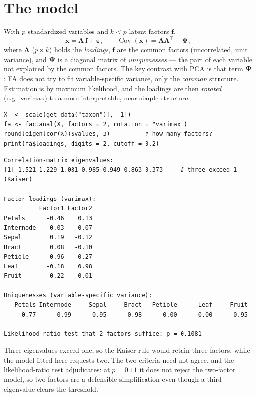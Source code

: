 \documentclass[11pt,oneside]{book}
\begin{document}
\section{The model}
With $p$ standardized variables and $k<p$ latent factors $\mathbf f$,
\[
  \mathbf x=\mathbf\Lambda\,\mathbf f+\boldsymbol\varepsilon,\qquad
  \operatorname{Cov}(\mathbf x)=\mathbf\Lambda\mathbf\Lambda^{\!\top}+\mathbf\Psi,
\]
where $\mathbf\Lambda$ ($p\times k$) holds the \emph{loadings}, $\mathbf f$ are the
common factors (uncorrelated, unit variance), and $\mathbf\Psi$ is a diagonal matrix of
\emph{uniquenesses} — the part of each variable not explained by the common factors. The
key contrast with PCA is that term $\mathbf\Psi$: FA does not try to fit variable-specific
variance, only the \emph{common} structure. Estimation is by maximum likelihood, and the
loadings are then \emph{rotated} (e.g.\ varimax) to a more interpretable, near-simple
structure.

\begin{lstlisting}
X  <- scale(get_data("taxon")[, -1])
fa <- factanal(X, factors = 2, rotation = "varimax")
round(eigen(cor(X))$values, 3)          # how many factors?
print(fa$loadings, digits = 2, cutoff = 0.2)
\end{lstlisting}

\begin{lstlisting}[style=rout]
Correlation-matrix eigenvalues:
[1] 1.521 1.229 1.081 0.985 0.949 0.863 0.373     # three exceed 1 (Kaiser)

Factor loadings (varimax):
          Factor1 Factor2
Petals      -0.46    0.13
Internode    0.03    0.07
Sepal        0.19   -0.12
Bract        0.08   -0.10
Petiole      0.96    0.27
Leaf        -0.18    0.98
Fruit        0.22    0.01

Uniquenesses (variable-specific variance):
   Petals Internode     Sepal     Bract   Petiole      Leaf     Fruit
     0.77      0.99      0.95      0.98      0.00      0.00      0.95

Likelihood-ratio test that 2 factors suffice: p = 0.1081
\end{lstlisting}

Three eigenvalues exceed one, so the Kaiser rule would retain three factors, while the
model fitted here requests two. The two criteria need not agree, and the likelihood-ratio
test adjudicates: at $p=0.11$ it does not reject the two-factor model, so two factors are a
defensible simplification even though a third eigenvalue clears the threshold.
\end{document}
